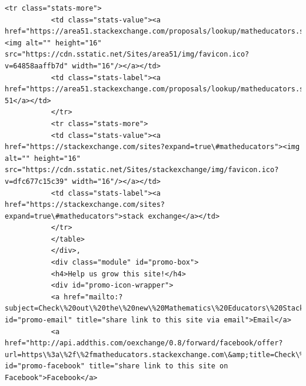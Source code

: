 \documentclass[11pt]{article}
\begin{document}
\begin{Verbatim}[commandchars=\\\{\}]
           <tr class="stats-more">
           <td class="stats-value"><a href="https://area51.stackexchange.com/proposals/lookup/matheducators.stackexchange.com"><img alt="" height="16" src="https://cdn.sstatic.net/Sites/area51/img/favicon.ico?v=64858aaffb7d" width="16"/></a></td>
           <td class="stats-label"><a href="https://area51.stackexchange.com/proposals/lookup/matheducators.stackexchange.com">area 51</a></td>
           </tr>
           <tr class="stats-more">
           <td class="stats-value"><a href="https://stackexchange.com/sites?expand=true\#matheducators"><img alt="" height="16" src="https://cdn.sstatic.net/Sites/stackexchange/img/favicon.ico?v=dfc677c15c39" width="16"/></a></td>
           <td class="stats-label"><a href="https://stackexchange.com/sites?expand=true\#matheducators">stack exchange</a></td>
           </tr>
           </table>
           </div>,
           <div class="module" id="promo-box">
           <h4>Help us grow this site!</h4>
           <div id="promo-icon-wrapper">
           <a href="mailto:?subject=Check\%20out\%20the\%20new\%20Mathematics\%20Educators\%20Stack\%20Exchange\%20Q\%26A\%20site\%20from\%20Stack\%20Exchange\&amp;body=Hi!\%0d\%0a\%0d\%0aI\%27m\%20supporting\%20a\%20new\%20Q\%26A\%20website\%20for\%20those\%20involved\%20in\%20the\%20field\%20of\%20teaching\%20mathematics.\%0d\%0a\%0d\%0aIt\%27s\%20built\%20on\%20the\%20same\%20software\%20as\%20stackoverflow.com\%2c\%20a\%20hugely\%20popular\%20site\%20where\%20over\%20seven\%20million\%20programmers\%20help\%20each\%20other\%20with\%20difficult\%20programming\%20problems.\%20On\%20Stack\%20Overflow\%20the\%20audience\%20votes\%20for\%20the\%20best\%20answer\%2c\%20so\%20the\%20answer\%20you\%20want\%20is\%20usually\%20right\%20at\%20the\%20top\%2c\%20not\%20on\%20page\%20five.\%0d\%0a\%0d\%0aI\%27m\%20hoping\%20that\%20a\%20site\%20for\%20those\%20involved\%20in\%20the\%20field\%20of\%20teaching\%20mathematics\%20would\%20have\%20the\%20same\%20kind\%20of\%20network\%20effect\%20and\%20turn\%20into\%20an\%20amazing\%20resource.\%0d\%0a\%0d\%0aThe\%20public\%20beta\%20is\%20going\%20on\%20here\%2c\%20if\%20you\%27re\%20interested\%20in\%20participating\%3a\%0d\%0a\%0d\%0ahttps\%3a\%2f\%2fmatheducators.stackexchange.com\%0d\%0a\%0d\%0aThanks!" id="promo-email" title="share link to this site via email">Email</a>
           <a href="http://api.addthis.com/oexchange/0.8/forward/facebook/offer?url=https\%3a\%2f\%2fmatheducators.stackexchange.com\&amp;title=Check\%20out\%20the\%20new\%20Mathematics\%20Educators\%20Stack\%20Exchange\%20Q\%26A\%20site\%20from\%20Stack\%20Exchange\&amp;username=stackoverflow" id="promo-facebook" title="share link to this site on Facebook">Facebook</a>

\end{Verbatim}
\end{document}

